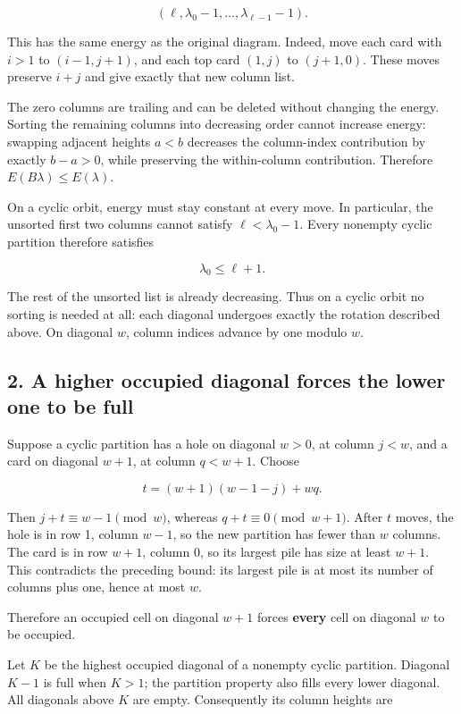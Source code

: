 \documentclass[11pt,a4paper]{article}
\begin{document}
\[
(\ell,\lambda_0-1,\ldots,\lambda_{\ell-1}-1).
\]

This has the same energy as the original diagram. Indeed, move each card with \(i>1\) to \((i-1,j+1)\), and each top card \((1,j)\) to \((j+1,0)\). These moves preserve \(i+j\) and give exactly that new column list.

The zero columns are trailing and can be deleted without changing the energy. Sorting the remaining columns into decreasing order cannot increase energy: swapping adjacent heights \(a<b\) decreases the column-index contribution by exactly \(b-a>0\), while preserving the within-column contribution. Therefore \(E(B\lambda)\le E(\lambda)\).

On a cyclic orbit, energy must stay constant at every move. In particular, the unsorted first two columns cannot satisfy \(\ell<\lambda_0-1\). Every nonempty cyclic partition therefore satisfies

\[
\lambda_0\le\ell+1.
\]

The rest of the unsorted list is already decreasing. Thus on a cyclic orbit no sorting is needed at all: each diagonal undergoes exactly the rotation described above. On diagonal \(w\), column indices advance by one modulo \(w\).

\subsection{2. A higher occupied diagonal forces the lower one to be full}\label{a-higher-occupied-diagonal-forces-the-lower-one-to-be-full}

Suppose a cyclic partition has a hole on diagonal \(w>0\), at column \(j<w\), and a card on diagonal \(w+1\), at column \(q<w+1\). Choose

\[
t=(w+1)(w-1-j)+wq.
\]

Then \(j+t\equiv w-1\pmod w\), whereas \(q+t\equiv0\pmod{w+1}\). After \(t\) moves, the hole is in row 1, column \(w-1\), so the new partition has fewer than \(w\) columns. The card is in row \(w+1\), column 0, so its largest pile has size at least \(w+1\). This contradicts the preceding bound: its largest pile is at most its number of columns plus one, hence at most \(w\).

Therefore an occupied cell on diagonal \(w+1\) forces \textbf{every} cell on diagonal \(w\) to be occupied.

Let \(K\) be the highest occupied diagonal of a nonempty cyclic partition. Diagonal \(K-1\) is full when \(K>1\); the partition property also fills every lower diagonal. All diagonals above \(K\) are empty. Consequently its column heights are
\end{document}
